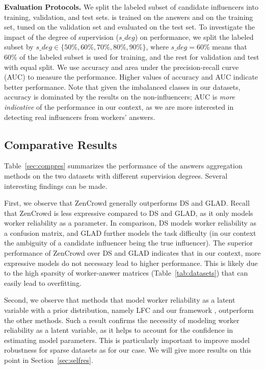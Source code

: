 \smallskip
\noindent\textbf{Evaluation Protocols.} We split the labeled subset of candidate influencers into training, validation, and test sets. \sys is trained on the answers and on the training set, tuned on the validation set and evaluated on the test set. To investigate the impact of the degree of supervision ($s\_deg$) on \sys performance, we split the labeled subset by $s\_deg\in \{50\%, 60\%, 70\%, 80\%, 90\%\}$, where $s\_deg = 60\%$ means that 60\% of the labeled subset is used for training, and the rest for validation and test with equal split. We use accuracy and area under the precision-recall curve (AUC) to measure the performance. Higher values of accuracy and AUC indicate better performance. Note that given the imbalanced classes in our datasets, accuracy is dominated by the results on the non-influencers; AUC is \emph{more indicative} of the performance in our context, as we are more interested in detecting real influencers from workers' answers. 



\subsection{Comparative Results}
Table~\ref{sec:compres} summarizes the performance of the answers aggregation methods on the two datasets with different supervision degrees. Several interesting findings can be made.

First, we observe that ZenCrowd generally outperforms DS and GLAD. Recall that ZenCrowd is less expressive compared to DS and GLAD, as it only models worker reliability as a parameter. In comparison, DS models worker reliability as a confusion matrix, and GLAD further models the task difficulty (in our context the ambiguity of a candidate influencer being the true influencer). The superior performance of ZenCrowd  over DS and GLAD indicates that in our context, more expressive models do not necessary lead to higher performance. This is likely due to the high sparsity of worker-answer matrices (Table~\ref{tab:datasets}) that can easily lead to overfitting.

Second, we observe that methods that model worker reliability as a latent variable with a prior distribution, namely LFC and our framework \sys, outperform the other methods. Such a result confirms the necessity of modeling worker reliability as a latent variable, as it helps to account for the confidence in estimating model parameters. This is particularly important to improve model robustness for sparse datasets as for our case. We  will give more results on this point in Section~\ref{sec:selfres}.

